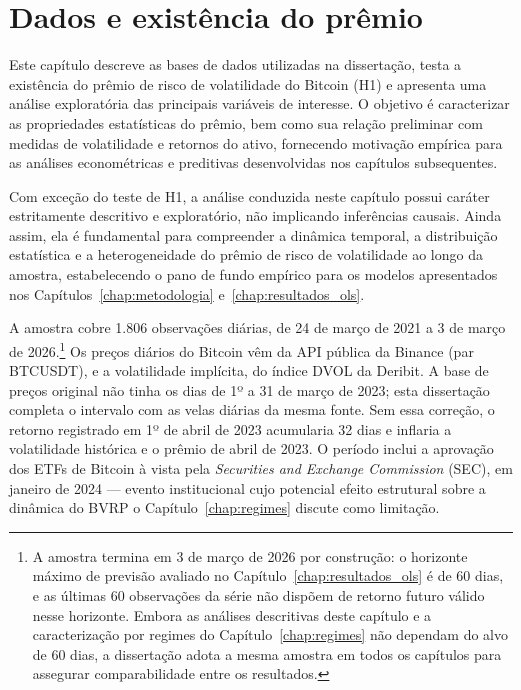 \chapter{Dados e existência do prêmio}
\label{chap:dados}

Este capítulo descreve as bases de dados utilizadas na dissertação, testa a
existência do prêmio de risco de volatilidade do Bitcoin (H1) e apresenta uma
análise exploratória das principais variáveis de interesse. O objetivo é
caracterizar as propriedades estatísticas do prêmio, bem como sua relação
preliminar com medidas de volatilidade e retornos do ativo, fornecendo
motivação empírica para as análises econométricas e preditivas desenvolvidas
nos capítulos subsequentes.

Com exceção do teste de H1, a análise conduzida neste capítulo possui caráter
estritamente descritivo e exploratório, não implicando inferências causais.
Ainda assim, ela é fundamental para compreender a dinâmica temporal, a
distribuição estatística e a heterogeneidade do prêmio de risco de volatilidade
ao longo da amostra, estabelecendo o pano de fundo empírico para os modelos
apresentados nos Capítulos~\ref{chap:metodologia} e~\ref{chap:resultados_ols}.

A amostra cobre 1.806 observações diárias, de 24 de março de 2021 a 3 de março de 2026.\footnote{A amostra termina em 3 de março de 2026 por construção: o horizonte máximo de previsão avaliado no Capítulo~\ref{chap:resultados_ols} é de 60 dias, e as últimas 60 observações da série não dispõem de retorno futuro válido nesse horizonte. Embora as análises descritivas deste capítulo e a caracterização por regimes do Capítulo~\ref{chap:regimes} não dependam do alvo de 60 dias, a dissertação adota a mesma amostra em todos os capítulos para assegurar comparabilidade entre os resultados.} Os preços diários do Bitcoin vêm da API pública da Binance (par BTCUSDT), e a volatilidade implícita, do índice DVOL da Deribit. A base de preços original não tinha os dias de 1º a 31 de março de 2023; esta dissertação completa o intervalo com as velas diárias da mesma fonte. Sem essa correção, o retorno registrado em 1º de abril de 2023 acumularia 32 dias e inflaria a volatilidade histórica e o prêmio de abril de 2023. O período inclui a aprovação dos ETFs de Bitcoin à vista pela \textit{Securities and Exchange Commission} (SEC), em janeiro de 2024 --- evento institucional cujo potencial efeito estrutural sobre a dinâmica do BVRP o Capítulo~\ref{chap:regimes} discute como limitação.

